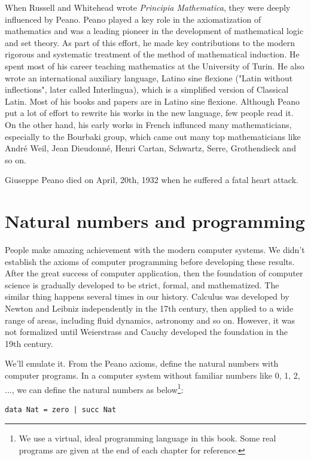 \documentclass[UTF8]{article}
\begin{document}
When Russell and Whitehead wrote {\em Principia Mathematica}, they were deeply influenced by Peano. Peano played a key role in the axiomatization of mathematics and was a leading pioneer in the development of mathematical logic and set theory. As part of this effort, he made key contributions to the modern rigorous and systematic treatment of the method of mathematical induction. He spent most of his career teaching mathematics at the University of Turin. He also wrote an international auxiliary language, Latino sine flexione ("Latin without inflections", later called Interlingua), which is a simplified version of Classical Latin. Most of his books and papers are in Latino sine flexione. Although Peano put a lot of effort to rewrite his works in the new language, few people read it. On the other hand, his early works in French influnced many mathematicians, especially to the Bourbaki group, which came out many top mathematicians like André Weil, Jean Dieudonné, Henri Cartan, Schwartz, Serre, Grothendieck and so on.

Giuseppe Peano died on April, 20th, 1932 when he suffered a fatal heart attack.

\section{Natural numbers and programming}

People make amazing achievement with the modern computer systems. We didn't establish the axioms of computer programming before developing these results. After the great success of computer application, then the foundation of computer science is gradually developed to be strict, formal, and mathematized. The similar thing happens several times in our history. Calculus was developed by Newton and Leibniz independently in the 17th century, then applied to a wide range of areas, including fluid dynamics, astronomy and so on. However, it was not formalized until Weierstrass and Cauchy developed the foundation in the 19th century\cite{M-Kline-2007}.

We'll emulate it. From the Peano axioms, define the natural numbers with computer programs. In a computer system without familiar numbers like 0, 1, 2, ..., we can define the natural numbers as below\footnote{We use a virtual, ideal programming language in this book. Some real programs are given at the end of each chapter for reference.}:

\lstset{language=Haskell}
\begin{lstlisting}
data Nat = zero | succ Nat
\end{lstlisting}
\end{document}
